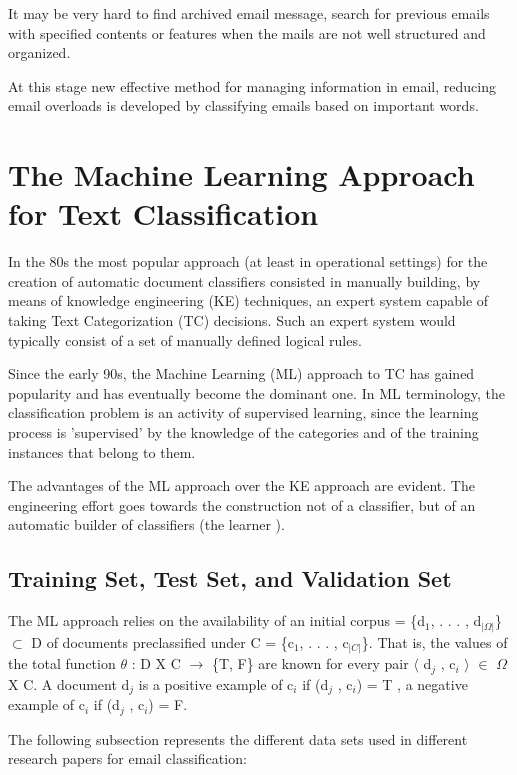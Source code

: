 It may be very hard to find archived email message, search for previous 
emails with specified contents or features when the mails are not well 
structured and organized.

At this stage new effective method for managing information in email, 
reducing email overloads is developed by classifying emails based on 
important words. \cite{taiwo2007}

\section{The Machine Learning Approach for Text Classification}

In the 80s the most popular approach (at least in operational settings) for the
creation of automatic document classiﬁers consisted in manually building, by means
of knowledge engineering (KE) techniques, an expert system capable of taking
Text Categorization (TC) decisions. Such an expert system would typically
consist of a set of manually defined logical rules.

Since the early 90s, the Machine Learning (ML) approach to TC has gained popularity and has eventually become the dominant one. In ML terminology, the classification problem is an activity of supervised learning, since the learning process is 'supervised' by the knowledge of
the categories and of the training instances that belong to them.

The advantages of the ML approach over the KE approach are evident. The engineering effort goes towards the construction not of a classiﬁer, but of an automatic builder of classiﬁers (the learner ). \cite{Sebastiani2002}

\subsection{Training Set, Test Set, and Validation Set}
The ML approach relies on the availability of an initial corpus = \{d$_{1}$, . . . , d$_{|\Omega|}$\} $\subset$ D of documents preclassified under C = \{c$_{1}$, . . . , c$_{|C|}$\}. That is, the values of the total function $\theta$ : D X C $\rightarrow$ \{T, F\} are known for every pair $\langle$ d$_{j}$ , c$_{i}$ $\rangle$ $\in$   $\Omega$ X C. A document d$_{j}$ is a positive example of c$_{i}$ if (d$_{j}$ , c$_{i}$) = T , a negative example of c$_{i}$ if
(d$_{j}$ , c$_{i}$) = F.

The following subsection represents the different data sets used  in different research papers for email classification:

